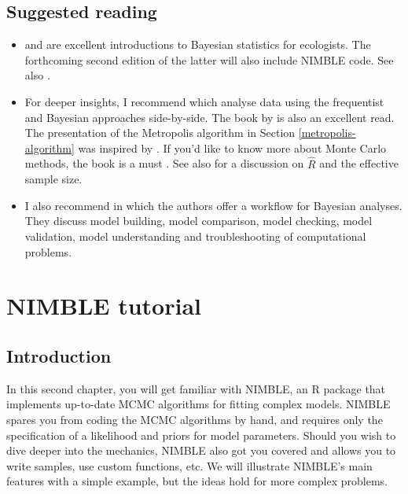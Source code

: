 \documentclass[
  12pt,
]{krantz}
\begin{document}
\section{Suggested reading}\label{suggested-reading}

\begin{itemize}
\item
  \citet{mccarthy2007} and \citet{KerySchaub2011} are excellent introductions to Bayesian statistics for ecologists. The forthcoming second edition of the latter will also include NIMBLE code. See also \citet{keryAppliedStatisticalModelling2024}.
\item
  For deeper insights, I recommend \citet{gelmanhill2006} which analyse data using the frequentist and Bayesian approaches side-by-side. The book by \citet{mcelreathbook} is also an excellent read. The presentation of the Metropolis algorithm in Section \ref{metropolis-algorithm} was inspired by \citet{alberthu2019}. If you'd like to know more about Monte Carlo methods, the book \citet{robert2004montecarlo} is a must \citep[see also its R counterpart][]{robert2004montecarloinr}. See also \citet{vehtariRankNormalizationFoldingLocalization2021} for a discussion on \(\hat{R}\) and the effective sample size.
\item
  I also recommend \citet{gelman2020workflow} in which the authors offer a workflow for Bayesian analyses. They discuss model building, model comparison, model checking, model validation, model understanding and troubleshooting of computational problems.
\end{itemize}

\chapter{NIMBLE tutorial}\label{intronimble}

\section{Introduction}\label{introduction-2}

In this second chapter, you will get familiar with NIMBLE, an R package that implements up-to-date MCMC algorithms for fitting complex models. NIMBLE spares you from coding the MCMC algorithms by hand, and requires only the specification of a likelihood and priors for model parameters. Should you wish to dive deeper into the mechanics, NIMBLE also got you covered and allows you to write samples, use custom functions, etc. We will illustrate NIMBLE's main features with a simple example, but the ideas hold for more complex problems.
\end{document}
